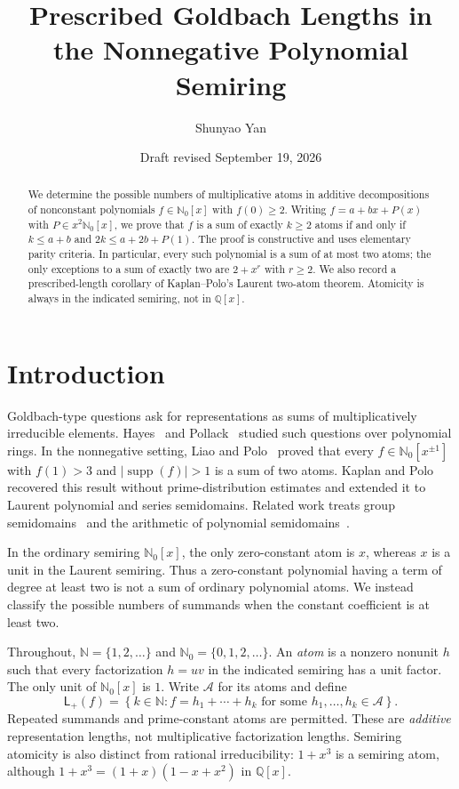 \documentclass[11pt]{amsart}
\title[Prescribed Goldbach lengths]{Prescribed Goldbach Lengths in the Nonnegative Polynomial Semiring}
\author{Shunyao Yan}
\date{Draft revised September 19, 2026}
\newcommand{\N}{\mathbb N}
\newcommand{\Nzero}{\mathbb N_0}
\newcommand{\Q}{\mathbb Q}
\newcommand{\Atoms}{\mathcal A}
\newcommand{\Lplus}{\mathsf L_{+}}
\DeclareMathOperator{\supp}{supp}
\theoremstyle{definition}
\theoremstyle{remark}
\begin{document}
\begin{abstract}
We determine the possible numbers of multiplicative atoms in additive
decompositions of nonconstant polynomials $f\in\Nzero[x]$ with $f(0)\ge2$.
Writing $f=a+bx+P(x)$ with $P\in x^2\Nzero[x]$, we prove that $f$ is a sum
of exactly $k\ge2$ atoms if and only if $k\le a+b$ and
$2k\le a+2b+P(1)$. The proof is constructive and uses elementary parity
criteria. In particular, every such polynomial is a sum of at most two
atoms; the only exceptions to a sum of exactly two are $2+x^r$ with
$r\ge2$. We also record a prescribed-length corollary of Kaplan--Polo's
Laurent two-atom theorem. Atomicity is always in the indicated semiring,
not in $\Q[x]$.
\end{abstract}

\maketitle

\section{Introduction}

Goldbach-type questions ask for representations as sums of multiplicatively
irreducible elements. Hayes~\cite{Hayes} and Pollack~\cite{Pollack} studied
such questions over polynomial rings. In the nonnegative setting,
Liao and Polo~\cite{LiaoPolo} proved that every
$f\in\Nzero[x^{\pm1}]$ with $f(1)>3$ and $|\supp(f)|>1$ is a sum of two
atoms. Kaplan and Polo~\cite{KaplanPolo} recovered this result without
prime-distribution estimates and extended it to Laurent polynomial and
series semidomains. Related work treats group semidomains~\cite{LiMopuriZhang}
and the arithmetic of polynomial semidomains~\cite{GottiPolo}.

In the ordinary semiring $\Nzero[x]$, the only zero-constant atom is $x$,
whereas $x$ is a unit in the Laurent semiring. Thus a zero-constant
polynomial having a term of degree at least two is not a sum of ordinary
polynomial atoms. We instead classify the possible numbers of summands
when the constant coefficient is at least two.

Throughout, $\N=\{1,2,\ldots\}$ and $\Nzero=\{0,1,2,\ldots\}$.
An \emph{atom} is a nonzero nonunit $h$ such that every factorization
$h=uv$ in the indicated semiring has a unit factor. The only unit of
$\Nzero[x]$ is $1$. Write $\Atoms$ for its atoms and define
\[
\Lplus(f)=
\left\{k\in\N: f=h_1+\cdots+h_k\text{ for some }h_1,\ldots,h_k\in\Atoms\right\}.
\]
Repeated summands and prime-constant atoms are permitted. These are
\emph{additive} representation lengths, not multiplicative factorization
lengths. Semiring atomicity is also distinct from rational irreducibility:
$1+x^3$ is a semiring atom, although
$1+x^3=(1+x)(1-x+x^2)$ in $\Q[x]$.
\end{document}
